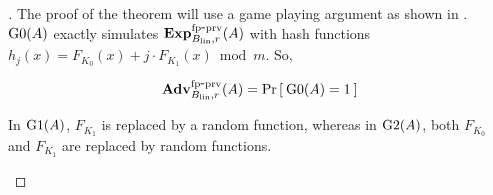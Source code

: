 \begin{proof}[]
The proof of the theorem will use a game playing argument as shown in . $\text{G0}(A)$ exactly simulates $\mathrm{\mathbf{Exp}}^{\mathrm{fp\mbox{-}prv}}_{B_\mathrm{lin},r}(A)$ with hash functions $h_j(x) =  F_{K_0}(x) + j\cdot F_{K_1}(x) \bmod m$. So,

\begin{equation}
\mathrm{\mathbf{Adv}}^{\mathrm{fp\mbox{-}prv}}_{B_{\mathrm{lin}},r}(A) = \Pr\left[\: \text{G0}(A)=1 \:\right]\label{eq:0}
\end{equation}

 In $\text{G1}(A)$, $F_{K_1}$ is replaced by a random function, whereas in $\text{G2}(A)$, both $F_{K_0}$ and $F_{K_1}$ are replaced by random functions.

\begin{figure}
\centering
{}
\end{figure}
\end{proof}
